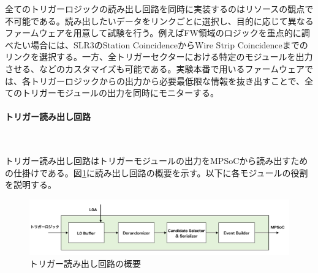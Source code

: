 全てのトリガーロジックの読み出し回路を同時に実装するのはリソースの観点で不可能である。読み出したいデータをリンクごとに選択し、目的に応じて異なるファームウェアを用意して試験を行う。例えばFW領域のロジックを重点的に調べたい場合には、SLR3のStation CoincidenceからWire Strip Coincidenceまでのリンクを選択する。一方、全トリガーセクターにおける特定のモジュールを出力させる、などのカスタマイズも可能である。実験本番で用いるファームウェアでは、各トリガーロジックからの出力から必要最低限な情報を抜き出すことで、全てのトリガーモジュールの出力を同時にモニターする。

\paragraph{トリガー読み出し回路}　　
\par
トリガー読み出し回路はトリガーモジュールの出力をMPSoCから読み出すための仕掛けである。図\ref{Readout_Circuite}に読み出し回路の概要を示す。以下に各モジュールの役割を説明する。

\begin{figure} 
\centering
\includegraphics[width=16cm]{fig/Test/Readout_Circuite.png}
\caption[トリガー読み出し回路の概要]{トリガー読み出し回路の概要}
\label{Readout_Circuite}
\end{figure}

